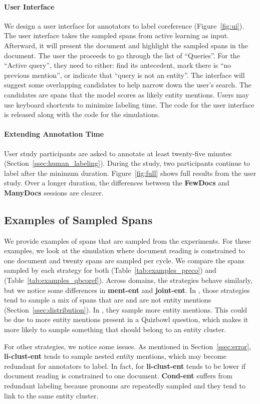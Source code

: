 \paragraph{User Interface} We design a user interface for annotators to label
coreference (Figure~\ref{fig:ui}). The user interface takes the sampled spans from active learning as
input. Afterward, it will present the document and highlight the sampled spans
in the document. The user the proceeds to go through the list of ``Queries''.
For the ``Active query'', they need to either: find its antecedent, mark there
is ``no previous mention'', or indicate that ``query is not an entity''. The
interface will suggest some overlapping candidates to help narrow down the
user's search. The candidates are spans that the \coref{} model scores as likely entity mentions. Users may use keyboard shortcuts to minimize labeling time. The code for the user interface is released along with the code for the simulations.





\paragraph{Extending Annotation Time}


User study participants are asked to annotate at least twenty-five minutes
(Section~\ref{ssec:human_labeling}). During the study, two participants continue to label
after the minimum duration. Figure~\ref{fig:full} shows full results from the
user study. Over a longer duration, the differences between the \textbf{FewDocs}
and \textbf{ManyDocs} sessions are clearer.

\subsection{Examples of Sampled Spans}
\label{ssec:examples}
We provide examples of spans that are sampled from the experiments. For these
examples, we look at the simulation where document reading is constrained to one
document and twenty spans are sampled per cycle. We compare the spans sampled by
each strategy for both \preco{} (Table~\ref{tab:examples_preco}) and \qbcoref{}
(Table~\ref{tab:examples_qbcoref}). Across domains, the strategies behave
similarly, but we notice some differences in \textbf{ment-ent} and
\textbf{joint-ent}.  In \preco{}, those strategies tend to sample a mix of spans
that are and are not entity mentions (Section~\ref{ssec:distribution}).  In \qbcoref{}, they sample more entity
mentions. This could be due to more entity mentions present in a Quizbowl
question, which makes it more likely to sample something that should belong to
an entity cluster.

For other strategies, we notice some issues. As mentioned in Section~\ref{ssec:error}, \textbf{li-clust-ent} tends to
sample nested entity mentions, which may become redundant for annotators to
label. In fact, \avgfone{} for \textbf{li-clust-ent} tends to be lower if
document reading is constrained to one document. \textbf{Cond-ent} suffers from
redundant labeling because pronouns are repeatedly sampled and they tend to
link to the same entity cluster.


